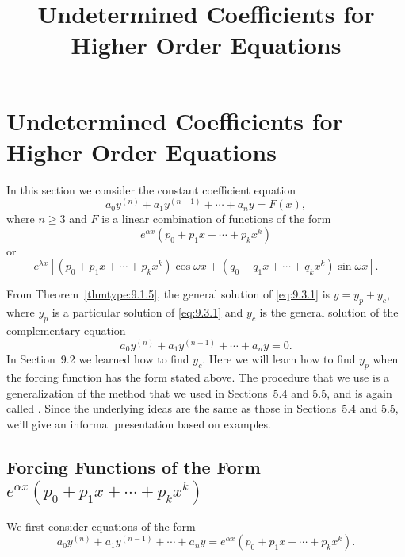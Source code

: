 \documentclass{ximera}
\title{Undetermined Coefficients for Higher Order Equations}%
\begin{document}
\begin{abstract}

\end{abstract}

\maketitle

\section*{Undetermined Coefficients for Higher Order Equations}

In this section we consider the constant coefficient equation
\begin{equation}
 \label{eq:9.3.1} a_0y^{(n)}+a_1y^{(n-1)}+\cdots+a_ny=F(x),
\end{equation}
where $n\geq 3$ and $F$ is a linear combination of
functions of the form
$$
e^{\alpha x}\left(p_0+p_1x+\cdots+p_kx^k\right)
$$
or
$$
e^{\lambda x}\left[\left(p_0+p_1x+\cdots+p_kx^k\right)
\cos\omega x+
\left(q_0+q_1x+\cdots+q_kx^k\right)
\sin\omega x\right].
$$

From Theorem~\ref{thmtype:9.1.5}, the general solution of \eqref{eq:9.3.1} is
$y=y_p+y_c$, where $y_p$ is a particular solution of \eqref{eq:9.3.1} and
$y_c$ is the general solution of the complementary equation
$$
a_0y^{(n)}+a_1y^{(n-1)}+\cdots+a_ny=0.
$$
In Section~9.2 we learned how to find $y_c$. Here
we
will learn how to find $y_p$ when the forcing function has the form stated
above. The procedure that we  use is a generalization of the
method that we used in Sections~5.4 and
5.5, and is again called
. Since
the underlying ideas are the same as those in
Sections~5.4 and 5.5,
we'll give  an informal presentation based on
examples.

\subsection*{Forcing Functions of the Form
$e^{\alpha x}\left(p_0+p_1x+\cdots+p_kx^k\right)$}

We  first consider  equations of the form
$$
a_0y^{(n)}+a_1y^{(n-1)}+\cdots+a_ny=e^{\alpha
x}\left(p_0+p_1x+\cdots+p_kx^k\right).
$$
\end{document}
